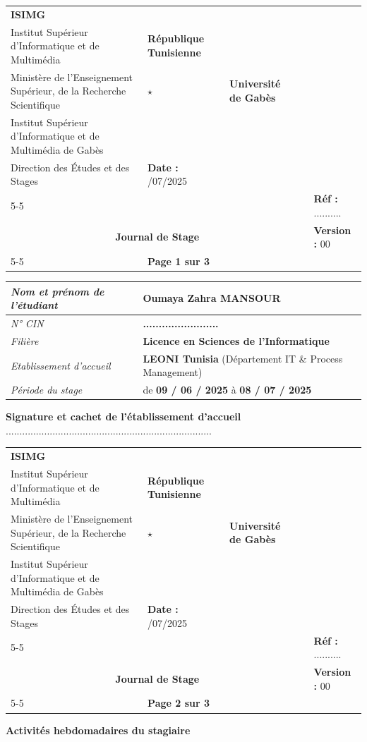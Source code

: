 \documentclass[11pt,a4paper]{article}
\newcommand{\journalheader}[1]{%
\noindent
\begin{tabular}{|p{3.2cm}|p{4.4cm}|p{0.7cm}|p{4.7cm}|p{3.2cm}|}
\hline
\centering \textbf{ISIMG}\\[2pt] {\tiny Institut Supérieur d'Informatique et de Multimédia}
& \centering \scriptsize \textbf{République Tunisienne}\\[2pt] \scriptsize Ministère de l'Enseignement Supérieur, de la Recherche Scientifique
& \centering \Large $\star$
& \centering \scriptsize \textbf{Université de Gabès}\\[2pt] \scriptsize Institut Supérieur d'Informatique et de Multimédia de Gabès\\[2pt] \scriptsize Direction des Études et des Stages
& \textbf{Date :} \newline 06/07/2025 \\ \cline{5-5}
& & & & \textbf{Réf :} .......... \\ \hline
\multicolumn{4}{|c|}{\textbf{\Large Journal de Stage}} & \textbf{Version :} 00 \\ \cline{5-5}
\multicolumn{4}{|c|}{} & \textbf{Page #1 sur 3} \\ \hline
\end{tabular}%
\par\vspace{0.8cm}
}
\begin{document}
\journalheader{1}

\vspace{0.5cm}

\noindent
\begin{tabular}{|m{5.2cm}|m{11.8cm}|}
\hline
\rule{0pt}{1.2cm} \centering \textit{\Large Nom et prénom de l'étudiant} & \hspace{0.5cm} \textbf{\Large Oumaya Zahra MANSOUR} \\[0.4cm]
\hline
\rule{0pt}{1.2cm} \centering \textit{\Large N° CIN} & \hspace{0.5cm} \textbf{\Large ........................} \\[0.4cm]
\hline
\rule{0pt}{1.2cm} \centering \textit{\Large Filière} & \hspace{0.5cm} \textbf{\Large Licence en Sciences de l'Informatique} \\[0.4cm]
\hline
\rule{0pt}{1.4cm} \centering \textit{\Large Etablissement d'accueil} & \hspace{0.5cm} \textbf{\Large LEONI Tunisia} \newline \hspace*{0.5cm} \small (Département IT \& Process Management) \\[0.4cm]
\hline
\rule{0pt}{1.4cm} \centering \textit{\Large Période du stage} & \hspace{0.5cm} {\Large de \textbf{09 / 06 / 2025} \hspace{0.3cm} à \hspace{0.3cm} \textbf{08 / 07 / 2025}} \\[0.4cm]
\hline
\end{tabular}

\vfill

\begin{flushright}
\begin{minipage}{8cm}
\centering
\textbf{\large Signature et cachet de l'établissement d'accueil} \\[2.5cm]
...........................................................................
\end{minipage}
\end{flushright}

\vfill

\newpage
\journalheader{2}

\begin{center}
{\Large \textbf{Activités hebdomadaires du stagiaire}}
\end{center}
\end{document}
